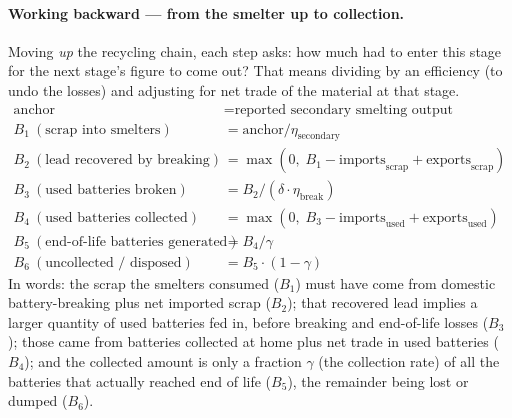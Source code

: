 \documentclass[11pt,a4paper]{article}
\begin{document}
\paragraph{Working backward --- from the smelter up to collection.} Moving
\emph{up} the recycling chain, each step asks: how much had to enter this stage for
the next stage's figure to come out? That means dividing by an efficiency (to undo
the losses) and adjusting for net trade of the material at that stage.
\begin{align*}
\text{anchor} &= \text{reported secondary smelting output} \\
B_1\ (\text{scrap into smelters}) &= \text{anchor} / \eta_{\text{secondary}} \\
B_2\ (\text{lead recovered by breaking}) &= \max(0,\; B_1 - \text{imports}_{\text{scrap}} + \text{exports}_{\text{scrap}}) \\
B_3\ (\text{used batteries broken}) &= B_2 / (\delta \cdot \eta_{\text{break}}) \\
B_4\ (\text{used batteries collected}) &= \max(0,\; B_3 - \text{imports}_{\text{used}} + \text{exports}_{\text{used}}) \\
B_5\ (\text{end-of-life batteries generated}) &= B_4 / \gamma \\
B_6\ (\text{uncollected / disposed}) &= B_5 \cdot (1-\gamma)
\end{align*}
In words: the scrap the smelters consumed ($B_1$) must have come from domestic
battery-breaking plus net imported scrap ($B_2$); that recovered lead implies a
larger quantity of used batteries fed in, before breaking and end-of-life losses
($B_3$); those came from batteries collected at home plus net trade in used
batteries ($B_4$); and the collected amount is only a fraction $\gamma$ (the
collection rate) of all the batteries that actually reached end of life ($B_5$),
the remainder being lost or dumped ($B_6$).
\end{document}
